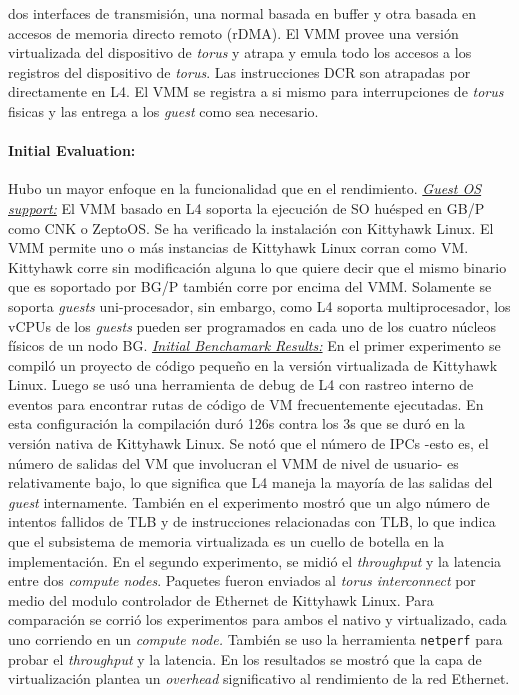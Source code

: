 dos interfaces de transmisión, una normal basada en buffer y otra basada en accesos de memoria directo remoto (rDMA). El VMM provee una versión virtualizada del dispositivo de \emph{torus} y atrapa y emula todo los accesos a los registros del dispositivo de \emph{torus}. Las instrucciones DCR son atrapadas por directamente en L4. El VMM se registra a si mismo para interrupciones de \emph{torus} fisicas y las entrega a los \emph{guest} como sea necesario.

\paragraph{\textnormal{\textbf{Initial Evaluation:}}}
Hubo un mayor enfoque en la funcionalidad que en el rendimiento. \underline{\emph{Guest OS support:}} El VMM basado en L4 soporta la ejecución de SO huésped en GB/P como CNK o ZeptoOS. Se ha verificado la instalación con Kittyhawk Linux. El VMM permite uno o más instancias de Kittyhawk Linux corran como VM. Kittyhawk corre sin modificación alguna lo que quiere decir que el mismo binario que es soportado por BG/P también corre por encima del VMM. Solamente se soporta \emph{guests} uni-procesador, sin embargo, como L4 soporta multiprocesador, los vCPUs de los \emph{guests} pueden ser programados en cada uno de los cuatro núcleos físicos de un nodo BG. \underline{\emph{Initial Benchamark Results:}} En el primer experimento se compiló un proyecto de código pequeño en la versión virtualizada de Kittyhawk Linux. Luego se usó una herramienta de debug de L4 con rastreo interno de eventos para encontrar rutas de código de VM frecuentemente ejecutadas. En esta configuración la compilación duró 126s contra los 3s que se duró en la versión nativa de Kittyhawk Linux. Se notó que el número de IPCs -esto es, el número de salidas del VM que involucran el VMM de nivel de usuario- es relativamente bajo, lo que significa que L4 maneja la mayoría de las salidas del \emph{guest} internamente. También en el experimento mostró que un algo número de intentos fallidos de TLB y de instrucciones relacionadas con TLB, lo que indica que el subsistema de memoria virtualizada es un cuello de botella en la implementación. En el segundo experimento, se midió el \emph{throughput} y la latencia entre dos \emph{compute nodes}. Paquetes fueron enviados al \emph{torus interconnect} por medio del modulo controlador de Ethernet de Kittyhawk Linux. Para comparación se corrió los experimentos para ambos el nativo y virtualizado, cada uno corriendo en un \emph{compute node.} También se uso la herramienta \texttt{netperf} para probar el \emph{throughput} y la latencia. En los resultados se mostró que la capa de virtualización plantea un \emph{overhead} significativo al rendimiento de la red Ethernet. 


